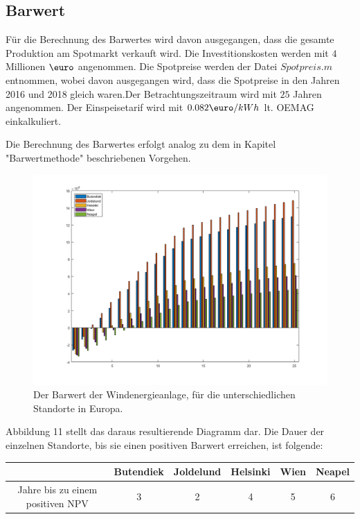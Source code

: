 \documentclass[a4paper,12pt]{article}
\begin{document}
	\subsection{Barwert}
	Für die Berechnung des Barwertes wird davon ausgegangen, dass die gesamte Produktion am Spotmarkt verkauft wird. Die Investitionskosten werden mit $4$ Millionen $\mbox{\euro}$ angenommen. Die Spotpreise werden der Datei $Spotpreis.m$ entnommen, wobei davon ausgegangen wird, dass die Spotpreise in den Jahren 2016 und 2018 gleich waren.\newline Der Betrachtungszeitraum wird mit $25$ Jahren angenommen. Der Einspeisetarif wird mit $0.082\mbox{\euro}/kWh$ lt. OEMAG einkalkuliert.\\ \par
	\noindent Die Berechnung des Barwertes erfolgt analog zu dem in Kapitel "Barwertmethode" beschriebenen Vorgehen.
	\begin{figure}[H]
		\centering
		\includegraphics[width=12cm]{img/results/BarwertAllerStandorte}
		\caption{Der Barwert der Windenergieanlage, für die unterschiedlichen Standorte in Europa.}
	\end{figure}
	\noindent Abbildung 11 stellt das daraus resultierende Diagramm dar.\newline
	Die Dauer der einzelnen Standorte, bis sie einen positiven Barwert erreichen, ist folgende:
	\begin{table}[H]
		\centering
		\begin{tabular}{|c|c|c|c|c|c|}
			\hline
			& Butendiek & Joldelund & Helsinki & Wien & Neapel \\ \hline
			Jahre bis zu einem positiven NPV & 3         & 2         & 4        & 5    & 6      \\ \hline
		\end{tabular}
	\end{table}
\end{document}
